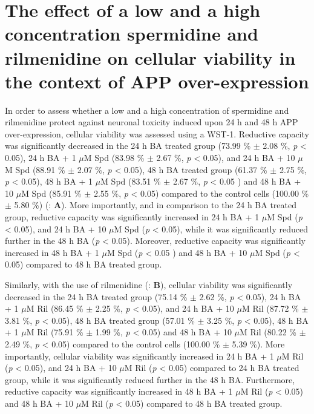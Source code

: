 \section{The effect of a low and a high concentration spermidine and rilmenidine on cellular viability in the context of APP over-expression}
In order to assess whether a low and a high concentration of spermidine and rilmenidine protect against neuronal toxicity induced upon  24 h and 48 h APP over-expression, cellular viability was assessed using a WST-1. Reductive capacity was significantly decreased in the 24 h BA treated group (73.99 \% $\pm$ 2.08 \%, \textit{p} < 0.05), 24 h BA + 1 $\mu$M Spd (83.98 \% $\pm$ 2.67 \%, \textit{p} < 0.05), and 24 h BA + 10 $\mu$M Spd (88.91 \% $\pm$ 2.07 \%, \textit{p} < 0.05), 48 h BA treated group (61.37 \% $\pm$ 2.75 \%, \textit{p} < 0.05), 48 h BA + 1 $\mu$M Spd (83.51 \% $\pm$ 2.67 \%, \textit{p} < 0.05 ) and 48 h BA + 10 $\mu$M Spd (85.91 \% $\pm$ 2.55 \%, \textit{p} < 0.05) compared to the control cells (100.00 \% $\pm$ 5.80 \%) (: \textbf{A}). More importantly, and in comparison to the 24 h BA treated group, reductive capacity was significantly increased in 24 h BA + 1 $\mu$M Spd (\textit{p} < 0.05), and 24 h BA + 10 $\mu$M Spd (\textit{p} < 0.05), while it was significantly reduced further in the 48 h BA (\textit{p} < 0.05). Moreover, reductive capacity was significantly increased in 48 h BA + 1 $\mu$M Spd (\textit{p} < 0.05 ) and 48 h BA + 10 $\mu$M Spd (\textit{p} < 0.05) compared to 48 h BA treated group. 

Similarly, with the use of rilmenidine (: \textbf{B}), cellular viability was significantly decreased in the 24 h BA treated group (75.14 \% $\pm$ 2.62 \%, \textit{p} < 0.05), 24 h BA + 1 $\mu$M Ril (86.45 \% $\pm$ 2.25 \%, \textit{p} < 0.05), and 24 h BA + 10 $\mu$M Ril (87.72 \% $\pm$ 3.81 \%, \textit{p} < 0.05), 48 h BA treated group (57.01 \% $\pm$ 3.25 \%, \textit{p} < 0.05), 48 h BA + 1 $\mu$M Ril (75.91 \% $\pm$ 1.99 \%, \textit{p} < 0.05) and 48 h BA + 10 $\mu$M Ril (80.22 \% $\pm$ 2.49 \%, \textit{p} < 0.05) compared to the control cells (100.00 \% $\pm$ 5.39 \%). More importantly, cellular viability was significantly increased in 24 h BA + 1 $\mu$M Ril (\textit{p} < 0.05), and 24 h BA + 10 $\mu$M Ril (\textit{p} < 0.05) compared to 24 h BA treated group, while it was significantly reduced further in the 48 h BA. Furthermore, reductive capacity was significantly increased in 48 h BA + 1 $\mu$M Ril (\textit{p} < 0.05) and 48 h BA + 10 $\mu$M Ril (\textit{p} < 0.05) compared to 48 h BA treated group. 

